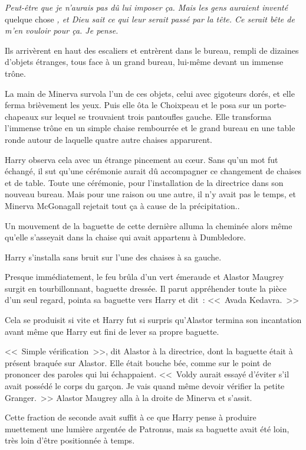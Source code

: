 \emph{Peut-être que je n'aurais pas dû lui imposer ça. Mais les gens auraient inventé} quelque chose \emph{, et Dieu sait ce qui leur serait passé par la tête. Ce serait bête de m'en vouloir pour ça. Je pense.}

Ils arrivèrent en haut des escaliers et entrèrent dans le bureau, rempli de dizaines d'objets étranges, tous face à un grand bureau, lui-même devant un immense trône.

La main de Minerva survola l'un de ces objets, celui avec gigoteurs dorés, et elle ferma brièvement les yeux. Puis elle ôta le Choixpeau et le posa sur un porte-chapeaux sur lequel se trouvaient trois pantoufles gauche. Elle transforma l'immense trône en un simple chaise rembourrée et le grand bureau en une table ronde autour de laquelle quatre autre chaises apparurent.

Harry observa cela avec un étrange pincement au cœur. Sans qu'un mot fut échangé, il sut qu'une cérémonie aurait dû accompagner ce changement de chaises et de table. Toute une cérémonie, pour l'installation de la directrice dans son nouveau bureau. Mais pour une raison ou une autre, il n'y avait pas le temps, et Minerva McGonagall rejetait tout ça à cause de la précipitation..

Un mouvement de la baguette de cette dernière alluma la cheminée alors même qu'elle s'asseyait dans la chaise qui avait appartenu à Dumbledore.

Harry s'installa sans bruit sur l'une des chaises à sa gauche.

Presque immédiatement, le feu brûla d'un vert émeraude et Alastor Maugrey surgit en tourbillonnant, baguette dressée. Il parut appréhender toute la pièce d'un seul regard, pointa sa baguette vers Harry et dit~: <<~Avada Kedavra.~>>

Cela se produisit si vite et Harry fut si surpris qu'Alastor termina son incantation avant même que Harry eut fini de lever sa propre baguette.

<<~Simple vérification~>>, dit Alastor à la directrice, dont la baguette était à présent braquée sur Alastor. Elle était bouche bée, comme sur le point de prononcer des paroles qui lui échappaient. <<~Voldy aurait essayé d'éviter s'il avait possédé le corps du garçon. Je vais quand même devoir vérifier la petite Granger.~>> Alastor Maugrey alla à la droite de Minerva et s'assit.

Cette fraction de seconde avait suffit à ce que Harry pense à produire muettement une lumière argentée de Patronus, mais sa baguette avait été loin, très loin d'être positionnée à temps.

